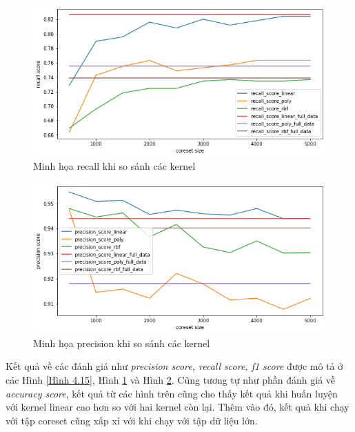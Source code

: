 \documentclass[a4paper, 12pt, oneside]{report}
\begin{document}
\begin{center}
    \begin{figure}[H]
    \begin{center}
     \includegraphics[scale=0.4]{HTRU2_6.png}
    \end{center}
    \caption{Minh họa recall khi so sánh các kernel}
    \label{Hình 4.16}
    \end{figure}
\end{center}
\begin{center}
    \begin{figure}[H]
    \begin{center}
     \includegraphics[scale=0.4]{HTRU2_7.png}
    \end{center}
    \caption{Minh họa precision khi so sánh các kernel}
    \label{Hình 4.17}
    \end{figure}
\end{center}

Kết quả về các đánh giá như \textit{precision score, recall score, f1 score} được mô tả ở các Hình \ref{Hình 4.15}, Hình \ref{Hình 4.16} và Hình \ref{Hình 4.17}. Cũng tương tự như phần đánh giá về \textit{accuracy score}, kết quả từ các hình trên cũng cho thấy kết quả khi huấn luyện với kernel linear cao hơn so với hai kernel còn lại. Thêm vào đó, kết quả khi chạy với tập coreset cũng xấp xỉ với khi chạy với tập dữ liệu lớn. 
\end{document}
